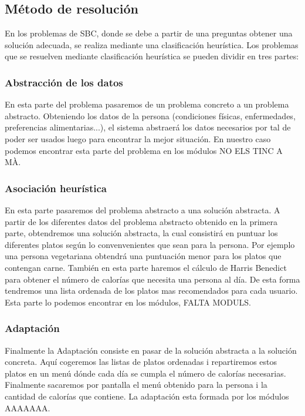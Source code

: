 \documentclass[12]{article}
\begin{document}
\subsection{Método de resolución}

En los problemas de SBC, donde se debe a partir de una preguntas obtener una solución adecuada, se realiza mediante una clasificación heurística.
Los problemas que se resuelven mediante clasificación heurística se pueden dividir en tres partes:

\subsubsection{Abstracción de los datos}

En esta parte del problema pasaremos de un problema concreto a un problema abstracto. 
Obteniendo los datos de la persona (condiciones físicas, enfermedades, preferencias alimentarias...), el sistema abstraerá los datos necesarios por tal de poder ser usados luego para encontrar la mejor situación.
En nuestro caso podemos encontrar esta parte del problema en los módulos NO ELS TINC A MÀ.

\subsubsection{Asociación heurística}

En esta parte pasaremos del problema abstracto a una solución abstracta.
A partir de los diferentes datos del problema abstracto obtenido en la primera parte, obtendremos una solución abstracta, la cual consistirá en puntuar los diferentes platos según lo convenvenientes que sean para la persona.
Por ejemplo una persona vegetariana obtendrá una puntuación menor para los platos que contengan carne.
También en esta parte haremos el cálculo de Harris Benedict para obtener el número de calorías que necesita una persona al día.
De esta forma tendremos una lista ordenada de los platos mas recomendados para cada usuario.
Esta parte lo podemos encontrar en los módulos, FALTA MODULS.

\subsubsection{Adaptación}

Finalmente la Adaptación consiste en pasar de la solución abstracta a la solución concreta.
Aquí cogeremos las listas de platos ordenadas i repartiremos estos platos en un menú dónde cada día se cumpla el número de calorías necesarias.
Finalmente sacaremos por pantalla el menú obtenido para la persona i la cantidad de calorías que contiene.
La adaptación esta formada por los módulos AAAAAAA.
\end{document}
